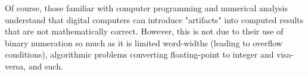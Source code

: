 \vskip 10pt

Of course, those familiar with computer programming and numerical analysis understand that digital computers can introduce "artifacts" into computed results that are not mathematically correct.  However, this is not due to their use of binary numeration so much as it is limited word-widths (leading to overflow conditions), algorithmic problems converting floating-point to integer and visa-versa, and such.




